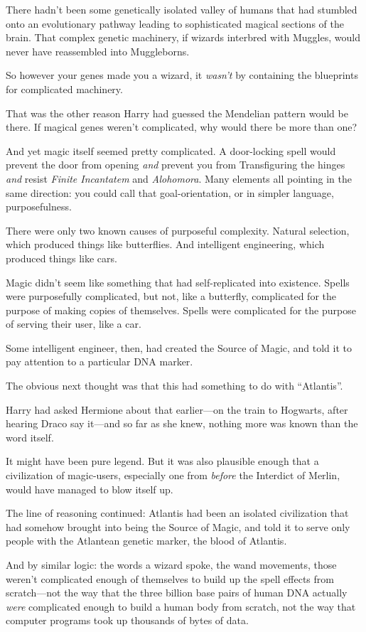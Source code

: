 There hadn’t been some genetically isolated valley of humans that had stumbled onto an evolutionary pathway leading to sophisticated magical sections of the brain. That complex genetic machinery, if wizards interbred with Muggles, would never have reassembled into Muggleborns.

So however your genes made you a wizard, it \emph{wasn’t} by containing the blueprints for complicated machinery.

That was the other reason Harry had guessed the Mendelian pattern would be there. If magical genes weren’t complicated, why would there be more than one?

And yet magic itself seemed pretty complicated. A door-locking spell would prevent the door from opening \emph{and} prevent you from Transfiguring the hinges \emph{and} resist \emph{Finite Incantatem} and \emph{Alohomora}. Many elements all pointing in the same direction: you could call that goal-orientation, or in simpler language, purposefulness.

There were only two known causes of purposeful complexity. Natural selection, which produced things like butterflies. And intelligent engineering, which produced things like cars.

Magic didn’t seem like something that had self-replicated into existence. Spells were purposefully complicated, but not, like a butterfly, complicated for the purpose of making copies of themselves. Spells were complicated for the purpose of serving their user, like a car.

Some intelligent engineer, then, had created the Source of Magic, and told it to pay attention to a particular DNA marker.

The obvious next thought was that this had something to do with “Atlantis”.

Harry had asked Hermione about that earlier—on the train to Hogwarts, after hearing Draco say it—and so far as she knew, nothing more was known than the word itself.

It might have been pure legend. But it was also plausible enough that a civilization of magic-users, especially one from \emph{before} the Interdict of Merlin, would have managed to blow itself up.

The line of reasoning continued: Atlantis had been an isolated civilization that had somehow brought into being the Source of Magic, and told it to serve only people with the Atlantean genetic marker, the blood of Atlantis.

And by similar logic: the words a wizard spoke, the wand movements, those weren’t complicated enough of themselves to build up the spell effects from scratch—not the way that the three billion base pairs of human DNA actually \emph{were} complicated enough to build a human body from scratch, not the way that computer programs took up thousands of bytes of data.


